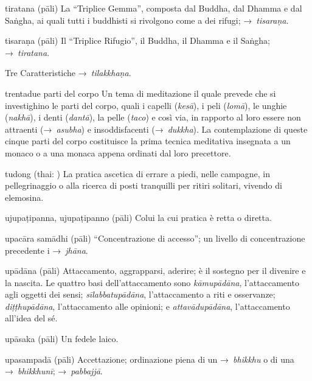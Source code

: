 \begin{glossarydescription}
\item[tiratana] (pāli) La ``Triplice Gemma'', composta dal Buddha, dal Dhamma e
  dal Saṅgha, ai quali tutti i buddhisti si rivolgono come a dei rifugi;
  →~\emph{tisaraṇa}.

\item[tisaraṇa] (pāli) Il ``Triplice Rifugio'', il Buddha, il Dhamma e il
  Saṅgha; →~\emph{tiratana}.

\item[Tre Caratteristiche] →~\emph{tilakkhaṇa}.

\item[trentadue parti del corpo] Un tema di meditazione il quale prevede che si
  investighino le parti del corpo, quali i capelli (\emph{kesā}), i peli
  (\emph{lomā}), le unghie (\emph{nakhā}), i denti (\emph{dantā}), la pelle
  (\emph{taco}) e così via, in rapporto al loro essere non attraenti
  (→~\emph{asubha}) e insoddisfacenti (→~\emph{dukkha}). La contemplazione di
  queste cinque parti del corpo costituisce la prima tecnica meditativa
  insegnata a un monaco o a una monaca appena ordinati dal loro precettore.

\item[tudong] (thai: ) La pratica ascetica di errare a piedi, nelle
  campagne, in pellegrinaggio o alla ricerca di posti tranquilli per ritiri
  solitari, vivendo di elemosina.


\item[ujupaṭipanna, ujupaṭipanno] (pāli) Colui la cui pratica è retta o diretta.

\item[upacāra samādhi] (pāli) ``Concentrazione di accesso''; un livello di
  concentrazione precedente i →~\emph{jhāna}.

\item[upādāna] (pāli)\label{glossary-upadana} Attaccamento, aggrapparsi, aderire; è il sostegno per il
  divenire e la nascita. Le quattro basi dell'attaccamento sono
  \emph{kāmupādāna}, l'attaccamento agli oggetti dei sensi;
  \emph{sīlabbatupādāna}, l'attaccamento a riti e osservanze;
  \emph{diṭṭhupādāna}, l'attaccamento alle opinioni; e \emph{attavādupādāna},
  l'attaccamento all'idea del sé.

\item[upāsaka] (pāli) Un fedele laico.

\item[upasampadā] (pāli) Accettazione; ordinazione piena di un →~\emph{bhikkhu}
  o di una →~\emph{bhikkhunī}; →~\emph{pabbajjā}.


\end{glossarydescription}

